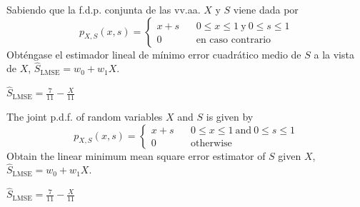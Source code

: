 \ifspanish

\question Sabiendo que la f.d.p. conjunta de las vv.aa. $X$ y $S$ viene dada por
$$p_{X,S}(x,s) = \left\{ \begin{array}{cl} x + s & ~~~~0\leq x \leq 1~\text{y}~0 \leq s \leq 1 \\ 0 & ~~~~\text{en caso contrario} \end{array}\right. $$
Obténgase el estimador lineal de mínimo error cuadrático medio de $S$ a la vista de $X$, $\hat S_\text{LMSE} = w_0 + w_1 X$.

\begin{solution}
$\hat S_\text{LMSE} = \displaystyle\frac{7}{11} - \displaystyle\frac{X}{11}$
\end{solution}

\else

\question The joint p.d.f. of random variables $X$ and $S$ is given by
$$p_{X,S}(x,s) = \left\{ \begin{array}{cl} x + s & ~~~~0\leq x \leq 1~\text{and}~0 \leq s \leq 1 \\ 0 & ~~~~\text{otherwise} \end{array}\right. $$
Obtain the linear minimum mean square error estimator of $S$ given $X$, $\hat S_\text{LMSE} = w_0 + w_1 X$.

\begin{solution}
$\hat S_\text{LMSE} = \displaystyle\frac{7}{11} - \displaystyle\frac{X}{11}$
\end{solution}

\fi